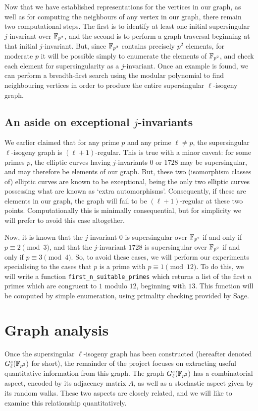     Now that we have established representations for the vertices in our graph, as well as for computing the neighbours of any vertex in our graph, there remain two computational steps. The first is to identify at least one initial supersingular $j$-invariant over $\mathbb{F}_{p^2}$, and the second is to perform a graph traversal beginning at that initial $j$-invariant. But, since $\mathbb{F}_{p^2}$ contains precisely $p^2$ elements, for moderate $p$ it will be possible simply to enumerate the elements of $\mathbb{F}_{p^2}$, and check each element for supersingularity as a $j$-invariant. Once an example is found, we can perform a breadth-first search using the modular polynomial to find neighbouring vertices in order to produce the entire supersingular $\ell$-isogeny graph.

        \subsection{An aside on exceptional \texorpdfstring{$j$}{j}-invariants}
            We earlier claimed that for any prime $p$ and any prime $\ell \neq p$, the supersingular $\ell$-isogeny graph is $(\ell+1)$-regular. This is true with a minor caveat: for some primes $p$, the elliptic curves having $j$-invariants $0$ or $1728$ may be supersingular, and may therefore be elements of our graph. But, these two (isomorphism classes of) elliptic curves are known to be exceptional, being the only two elliptic curves possessing what are known as `extra automorphisms'. Consequently, if these are elements in our graph, the graph will fail to be $(\ell+1)$-regular at these two points. Computationally this is minimally consequential, but for simplicity we will prefer to avoid this case altogether. 

            Now, it is known that the $j$-invariant $0$ is supersingular over $\mathbb{F}_{p^2}$ if and only if $p \equiv 2 \pmod{3}$, and that the $j$-invariant $1728$ is supersingular over $\mathbb{F}_{p^2}$ if and only if $p \equiv 3 \pmod{4}$. So, to avoid these cases, we will perform our experiments specialising to the cases that $p$ is a prime with $p \equiv 1 \pmod{12}$. To do this, we will write a function \verb|first_n_suitable_primes| which returns a list of the first $n$ primes which are congruent to $1$ modulo $12$, beginning with $13$. This function will be computed by simple enumeration, using primality checking provided by Sage.

    \section{Graph analysis}
        Once the supersingular $\ell$-isogeny graph has been constructed (hereafter denoted $G_\ell^s(\mathbb{F}_{p^2})$ for short), the remainder of the project focuses on extracting useful quantitative information from this graph. The graph $G_\ell^s(\mathbb{F}_{p^2})$ has a combinatorial aspect, encoded by its adjacency matrix $A$, as well as a stochastic aspect given by its random walks. These two aspects are closely related, and we will like to examine this relationship quantitatively.
        
